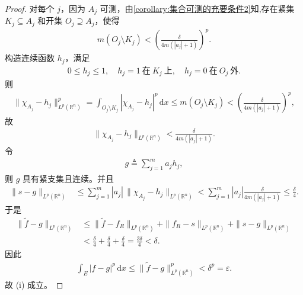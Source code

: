 \documentclass[../../main.tex]{subfiles}%
\begin{document}
\begin{proof}
对每个 \(j\)，因为 \(A_j\) 可测，由\cref{corollary:集合可测的充要条件2}知,存在紧集 \(K_j\subseteq A_j\) 和开集 \(O_j\supseteq A_j\)，使得
\begin{align*}
m(O_j\setminus K_j)<\left(\frac{\delta}{4m(|a_j|+1)}\right)^p.
\end{align*}
构造连续函数 \(h_j\)，满足
\begin{align*}
0\leqslant h_j\leqslant 1,\quad
h_j=1\ \text{在}\ K_j\ \text{上},\quad
h_j=0\ \text{在}\ O_j\ \text{外}.
\end{align*}
则
\begin{align*}
\|\chi_{A_j}-h_j\|_{L^p(\mathbb{R}^n)}^p
=\int_{O_j\setminus K_j}|\chi_{A_j}-h_j|^p\,\mathrm{d}x
\leqslant m(O_j\setminus K_j)
<\left(\frac{\delta}{4m(|a_j|+1)}\right)^p,
\end{align*}
故
\begin{align*}
\|\chi_{A_j}-h_j\|_{L^p(\mathbb{R}^n)}
<\frac{\delta}{4m(|a_j|+1)}.
\end{align*}
令
\begin{align*}
g\triangleq\sum_{j=1}^m a_j h_j,
\end{align*}
则 \(g\) 具有紧支集且连续。并且
\begin{align*}
\|s-g\|_{L^p(\mathbb{R}^n)}
&\leqslant\sum_{j=1}^m |a_j|\,\|\chi_{A_j}-h_j\|_{L^p(\mathbb{R}^n)}
<\sum_{j=1}^m |a_j|\frac{\delta}{4m(|a_j|+1)}
\leqslant\frac{\delta}{4}.
\end{align*}
于是
\begin{align*}
\|\widetilde f-g\|_{L^p(\mathbb{R}^n)}
&\leqslant\|\widetilde f-f_R\|_{L^p(\mathbb{R}^n)}
+\|f_R-s\|_{L^p(\mathbb{R}^n)}
+\|s-g\|_{L^p(\mathbb{R}^n)}
\\
&<\frac{\delta}{4}+\frac{\delta}{4}+\frac{\delta}{4}
=\frac{3\delta}{4}<\delta.
\end{align*}
因此
\begin{align*}
\int_E |f-g|^p\,\mathrm{d}x
\leqslant\|\widetilde f-g\|_{L^p(\mathbb{R}^n)}^p
<\delta^p=\varepsilon.
\end{align*}
故 (i) 成立。


\end{proof}
\end{document}
